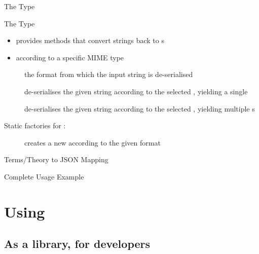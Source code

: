 \documentclass[handout]{beamer}
\begin{document}
\begin{frame}[allowframebreaks]{The  Type}
    
    \begin{block}{The  Type}
        \begin{itemize}
            \item provides methods that convert strings back to s
            \item according to a specific MIME type
        \end{itemize}
    \end{block}
    \begin{description}
        \item [] the format from which the input string is de-serialised
        \item [] de-serialises the given string according to the selected , yielding a single 
        \item []  de-serialises the given string according to the selected , yielding multiple s
    \end{description}

    \framebreak

    Static factories for :
    \begin{description}
        \item [] creates a new  according to the given format
    \end{description}

\end{frame}

\begin{frame}[allowframebreaks]{Terms/Theory to JSON Mapping}
    
\end{frame}

\begin{frame}[allowframebreaks]{Complete Usage Example}
\end{frame}

\section{Using \twopkt}

\subsection{As a library, for developers}
\end{document}
